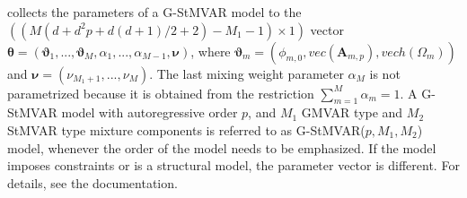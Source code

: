 \documentclass[nojss]{jss} %
\begin{document}
 collects the parameters of a G-StMVAR model to the $((M(d + d^2p + d(d+1)/2 + 2) - M_1 - 1)\times 1)$ vector $\boldsymbol{\theta}=(\boldsymbol{\vartheta}_1,...,\boldsymbol{\vartheta}_M,\alpha_1,...,\alpha_{M-1},\boldsymbol{\nu})$,  where $\boldsymbol{\vartheta}_m=(\phi_{m,0},vec(\boldsymbol{A}_{m,p}),vech(\Omega_m))$ and $\boldsymbol{\nu}=(\nu_{M_1+1},...,\nu_M)$.  The last mixing weight parameter $\alpha_M$ is not parametrized because it is obtained from the restriction $\sum_{m=1}^M \alpha_m = 1$.  A G-StMVAR model with autoregressive order $p$, and $M_1$ GMVAR type and $M_2$ StMVAR type mixture components is referred to as G-StMVAR($p,M_1,M_2$) model, whenever the order of the model needs to be emphasized. If the model imposes constraints or is a structural model, the parameter vector is different. For details, see the documentation.
\end{document}
